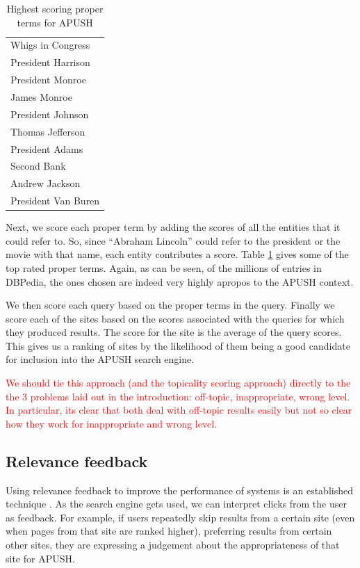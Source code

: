\documentclass{acm_proc_article-sp}
\begin{document}
\begin{table}
\begin{center}
\begin{tabular}{|l|} \hline
Whigs in Congress \\
President Harrison \\
President Monroe \\
James Monroe \\
President Johnson \\
Thomas Jefferson \\
President Adams \\
Second Bank \\
Andrew Jackson \\
President Van Buren \\
\hline\end{tabular}
\caption{Highest scoring proper terms for APUSH}
\label{tab-terms}
\end{center}
\end{table}

Next, we score each proper term by adding the scores of all the entities that it
could refer to. So, since ``Abraham Lincoln'' could refer to the president or the
movie with that name, each entity contributes a score. Table \ref{tab-terms}
gives some of the top rated proper terms. Again, as can be seen, of the millions
of entries in DBPedia, the ones chosen are indeed very highly apropos to the
APUSH context.  

We then score each query based on the proper terms in the query. Finally we
score each of the sites based on the scores associated with the queries for
which they produced results. The score for the site is the average of the query
scores. This gives us a ranking of sites by the likelihood of them being a good
candidate for inclusion into the APUSH search engine. 


\textcolor{red}{We should tie this approach (and the topicality scoring
  approach) directly to the the 3 problems laid out in the introduction:
  off-topic, inappropriate, wrong level. In particular, 
  its clear that both deal with off-topic results easily but not so clear how
  they work for inappropriate and wrong level.}

\subsection{Relevance feedback}

Using relevance feedback to improve the performance of systems is an established
technique \cite{salton1997improving}. As the search engine gets used, we can
interpret clicks from the user as feedback. For example, if users repeatedly
skip results from a certain site (even when pages from that site are ranked
higher), preferring results from certain other sites, they are expressing a
judgement about the appropriateness of that site for APUSH. 
\end{document}
